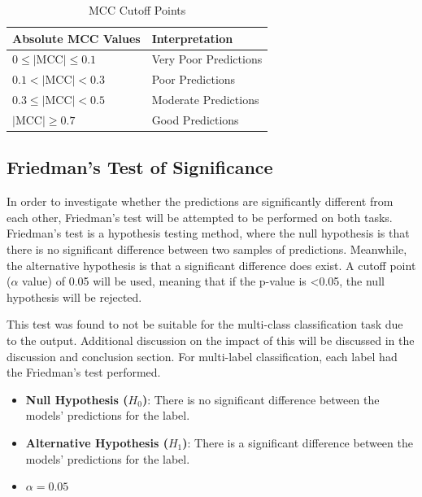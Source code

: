 \documentclass[10.7pt, onecolumn]{article}
\begin{document}
\begin{table}[H]
  \centering
  \small
  \begin{tabular}{|p{4cm}|p{3cm}|}
    \hline
    \textbf{Absolute MCC Values} & \textbf{Interpretation} \\
    \hline
    $0 \leq |\text{MCC}| \leq 0.1$ & Very Poor Predictions \\
    \hline
    $0.1 < |\text{MCC}| < 0.3$ & Poor Predictions \\
    \hline
    $0.3 \leq |\text{MCC}| < 0.5$ & Moderate Predictions \\
    \hline
    $|\text{MCC}| \geq 0.7$ & Good Predictions \\
    \hline
  \end{tabular}
  \caption{MCC Cutoff Points}
  \label{tab:mccInterpretation}
\end{table}

\subsection{Friedman's Test of Significance}
In order to investigate whether the predictions are significantly different from each other, Friedman's test will be attempted to be performed on both tasks. Friedman's test\cite{7c3c84e5-7230-3033-8b6c-ec430fb73d61}\cite{milton} is a hypothesis testing method, where the null hypothesis is that there is no significant difference between two samples of predictions\cite{HOFFMAN2015421}. Meanwhile, the alternative hypothesis is that a significant difference does exist. A cutoff point ($\alpha$ value) of 0.05 will be used, meaning that if the p-value is <0.05, the null hypothesis will be rejected.

This test was found to not be suitable for the multi-class classification task due to the output. Additional discussion on the impact of this will be discussed in the discussion and conclusion section. For multi-label classification, each label had the Friedman's test performed.

\begin{itemize}
  \item \textbf{Null Hypothesis (\(H_0\))}: There is no significant difference between the models' predictions for the label.

  \item \textbf{Alternative Hypothesis (\(H_1\))}: There is a significant difference between the models' predictions for the label.

  \item \( \alpha = 0.05 \)
\end{itemize}
\end{document}
